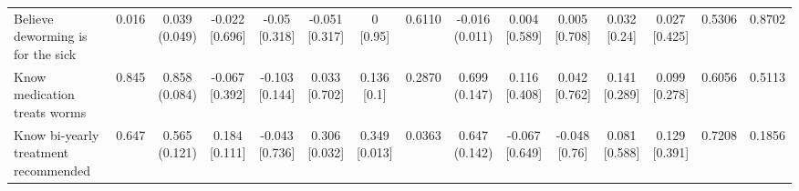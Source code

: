 {\begin{tabular}[t]{lcccccccccccccc}
\hspace{1em}Believe deworming is for the sick & 0.016 & \makecell[c]{0.039\\(0.049)} & \makecell[c]{-0.022\\{[0.696]}} & \makecell[c]{-0.05\\{[0.318]}} & \makecell[c]{-0.051\\{[0.317]}} & \makecell[c]{0\\{[0.95]}} & 0.6110 & \makecell[c]{-0.016\\(0.011)} & \makecell[c]{0.004\\{[0.589]}} & \makecell[c]{0.005\\{[0.708]}} & \makecell[c]{0.032\\{[0.24]}} & \makecell[c]{0.027\\{[0.425]}} & 0.5306 & 0.8702\\
\hspace{1em}Know medication treats worms & 0.845 & \makecell[c]{0.858\\(0.084)} & \makecell[c]{-0.067\\{[0.392]}} & \makecell[c]{-0.103\\{[0.144]}} & \makecell[c]{0.033\\{[0.702]}} & \makecell[c]{0.136\\{[0.1]}} & 0.2870 & \makecell[c]{0.699\\(0.147)} & \makecell[c]{0.116\\{[0.408]}} & \makecell[c]{0.042\\{[0.762]}} & \makecell[c]{0.141\\{[0.289]}} & \makecell[c]{0.099\\{[0.278]}} & 0.6056 & 0.5113\\
\hspace{1em}Know bi-yearly treatment recommended & 0.647 & \makecell[c]{0.565\\(0.121)} & \makecell[c]{0.184\\{[0.111]}} & \makecell[c]{-0.043\\{[0.736]}} & \makecell[c]{0.306\\{[0.032]}} & \makecell[c]{0.349\\{[0.013]}} & 0.0363 & \makecell[c]{0.647\\(0.142)} & \makecell[c]{-0.067\\{[0.649]}} & \makecell[c]{-0.048\\{[0.76]}} & \makecell[c]{0.081\\{[0.588]}} & \makecell[c]{0.129\\{[0.391]}} & 0.7208 & 0.1856\\

\end{tabular}}

